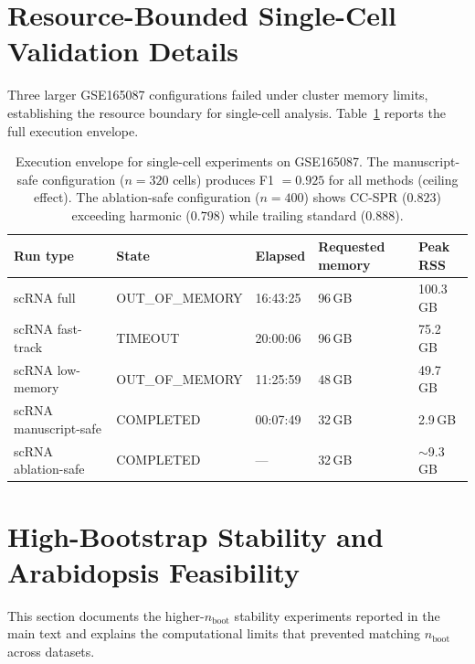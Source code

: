\documentclass[11pt]{article}
\begin{document}
\section{Resource-Bounded Single-Cell Validation Details}
\label{sec:supp_scrna}

Three larger GSE165087 configurations failed under cluster memory limits, establishing the resource boundary for single-cell analysis.
Table~\ref{tab:supp_scrna} reports the full execution envelope.

\begin{table}[h]
\centering
\small
\begin{tabular}{lllll}
\toprule
Run type & State & Elapsed & Requested memory & Peak RSS \\
\midrule
scRNA full & OUT\_OF\_MEMORY & 16:43:25 & 96\,GB & 100.3\,GB \\
scRNA fast-track & TIMEOUT & 20:00:06 & 96\,GB & 75.2\,GB \\
scRNA low-memory & OUT\_OF\_MEMORY & 11:25:59 & 48\,GB & 49.7\,GB \\
scRNA manuscript-safe & COMPLETED & 00:07:49 & 32\,GB & 2.9\,GB \\
scRNA ablation-safe & COMPLETED & --- & 32\,GB & ${\sim}$9.3\,GB \\
\bottomrule
\end{tabular}
\caption{Execution envelope for single-cell experiments on GSE165087.
The manuscript-safe configuration ($n=320$ cells) produces F1 $= 0.925$ for all methods (ceiling effect).
The ablation-safe configuration ($n=400$) shows CC-SPR ($0.823$) exceeding harmonic ($0.798$) while trailing standard ($0.888$).}
\label{tab:supp_scrna}
\end{table}


\section{High-Bootstrap Stability and Arabidopsis Feasibility}
\label{sec:supp_feasibility}

This section documents the higher-$n_{\text{boot}}$ stability experiments reported in the main text and explains the computational limits that prevented matching $n_{\text{boot}}$ across datasets.
\end{document}
